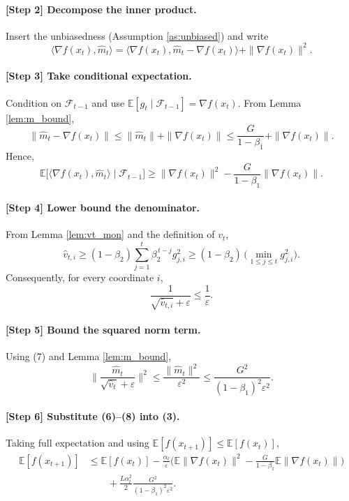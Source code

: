\documentclass[11pt]{article}
\begin{document}
\paragraph{[Step 2] Decompose the inner product.}
Insert the unbiasedness (Assumption \ref{as:unbiased}) and write
\[
\langle\nabla f(x_t),\hat m_t\rangle
= \langle\nabla f(x_t),\hat m_t-\nabla f(x_t)\rangle+\|\nabla f(x_t)\|^{2}.
\tag{4}
\]

\paragraph{[Step 3] Take conditional expectation.}
Condition on $\mathcal{F}_{t-1}$ and use $\mathbb{E}[g_t\mid\mathcal{F}_{t-1}]=\nabla f(x_t)$.
From Lemma \ref{lem:m_bound},
\[
\big\|\hat m_t-\nabla f(x_t)\big\|\le \|\hat m_t\|+\|\nabla f(x_t)\|
\le \frac{G}{1-\beta_1}+\|\nabla f(x_t)\|.
\tag{5}
\]
Hence,
\[
\mathbb{E}\Big[\langle\nabla f(x_t),\hat m_t\rangle\mid\mathcal{F}_{t-1}\Big]
\ge \|\nabla f(x_t)\|^{2}
- \frac{G}{1-\beta_1}\|\nabla f(x_t)\|.
\tag{6}
\]

\paragraph{[Step 4] Lower bound the denominator.}
From Lemma \ref{lem:vt_mon} and the definition of $v_t$,
\[
\hat v_{t,i}\ge (1-\beta_2)\sum_{j=1}^{t}\beta_2^{\,t-j} g_{j,i}^{2}
\ge (1-\beta_2) \, \big(\min_{1\le j\le t} g_{j,i}^{2}\big).
\]
Consequently, for every coordinate $i$,
\[
\frac{1}{\sqrt{\hat v_{t,i}}+\varepsilon}\le \frac{1}{\varepsilon}.
\tag{7}
\]

\paragraph{[Step 5] Bound the squared norm term.}
Using (7) and Lemma \ref{lem:m_bound},
\[
\Big\|\frac{\hat m_t}{\sqrt{\hat v_t}+\varepsilon}\Big\|^{2}
\le \frac{\|\hat m_t\|^{2}}{\varepsilon^{2}}
\le \frac{G^{2}}{(1-\beta_1)^{2}\varepsilon^{2}}.
\tag{8}
\]

\paragraph{[Step 6] Substitute (6)–(8) into (3).}
Taking full expectation and using $\mathbb{E}[f(x_{t+1})]\le\mathbb{E}[f(x_t)]$,
\[
\begin{aligned}
\mathbb{E}[f(x_{t+1})]
&\le \mathbb{E}[f(x_t)]
-\frac{\alpha_t}{\varepsilon}\Big(\mathbb{E}\|\nabla f(x_t)\|^{2}
- \frac{G}{1-\beta_1}\mathbb{E}\|\nabla f(x_t)\|\Big)\\
&\qquad+\frac{L\alpha_t^{2}}{2}\frac{G^{2}}{(1-\beta_1)^{2}\varepsilon^{2}} .
\end{aligned}
\tag{9}
\]
\end{document}
